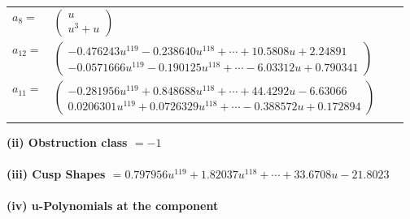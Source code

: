 \documentclass[1p]{elsarticle_modified}
\theoremstyle{definition}
\begin{document}
\begin{tabular}{m{7pt} m{180pt} m{7pt} m{180pt} }
\flushright $a_{8}=$&$\begin{pmatrix}u\\u^3+u\end{pmatrix}$ \\
\flushright $a_{12}=$&$\begin{pmatrix}-0.476243 u^{119}-0.238640 u^{118}+\cdots+10.5808 u+2.24891\\-0.0571666 u^{119}-0.190125 u^{118}+\cdots-6.03312 u+0.790341\end{pmatrix}$ \\
\flushright $a_{11}=$&$\begin{pmatrix}-0.281956 u^{119}+0.848688 u^{118}+\cdots+44.4292 u-6.63066\\0.0206301 u^{119}+0.0726329 u^{118}+\cdots-0.388572 u+0.172894\end{pmatrix}$\\&\end{tabular}
\flushleft \textbf{(ii) Obstruction class $= -1$}\\~\\
\flushleft \textbf{(iii) Cusp Shapes $= 0.797956 u^{119}+1.82037 u^{118}+\cdots+33.6708 u-21.8023$}\\~\\
\newpage\renewcommand{\arraystretch}{1}
\flushleft \textbf{(iv) u-Polynomials at the component}\newline \\
\end{document}
